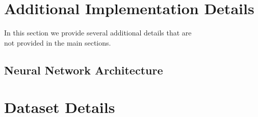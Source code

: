 \clearpage
\appendix
\onecolumn

\section{Additional Implementation Details}

In this section we provide several additional details that are\\
not provided in the main sections.

\subsection{Neural Network Architecture}
\label{sec:network_arch}

\twocolumn
\subsection{}
\section{Dataset Details}
\label{sec:dataset_detail}